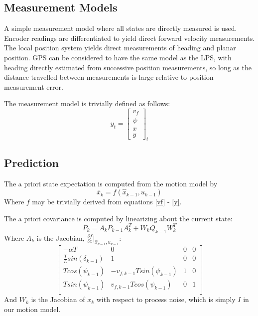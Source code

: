 \documentclass[11pt]{article} %
\begin{document}
\subsection{Measurement Models}

A simple measurement model where all states are directly measured is used.  Encoder readings are differentiated to yield direct forward velocity measurements.
The local position system yields direct measurements of heading and planar position.  
GPS can be considered to have the same model as the LPS, with heading directly estimated from successive position measurements, so long as the distance travelled between measurements is large relative to position measurement error.

The measurement model is trivially defined as follows:
\begin{equation}
y_t = \left[ \begin{array}{c} v_f \\ \psi \\ x \\ y \end{array} \right]_t
\end{equation}

\subsection{Prediction}

The a priori state expectation is computed from the motion model by
\begin{equation}
\bar{x}_k = f(\hat{x}_{k-1}, u_{k-1})
\end{equation}
Where $f$ may be trivially derived from equations \ref{vf} - \ref{y}. 

The a priori covariance is computed by linearizing about the current state:
\begin{equation}
\bar{P}_k = A_kP_{k-1}A_k^T + W_kQ_{k-1}W_k^T
\end{equation}
Where $A_k$ is the Jacobian, $\frac{\delta f}{\delta x} | _{\hat{x}_{k-1}, u_{k-1}}$:
\renewcommand{\arraystretch}{1.4}
\begin{equation}
\left[ \begin{array}{cccc}
-\alpha T & 0 & 0 & 0 \\
\frac{T}{L} sin( \delta _{k-1} ) & 1 & 0 & 0 \\
T cos(\psi _{k-1}) & - v_{f,k-1} T sin( \psi _{k-1}) & 1 & 0 \\
T sin(\psi _{k-1}) & v_{f,k-1} T cos ( \psi _{k-1}) & 0 & 1 \\
\end{array} \right]
\end{equation}
\renewcommand{\arraystretch}{1}
And $W_k$ is the Jacobian of $x_k$ with respect to process noise, which is simply $I$ in our motion model.
\end{document}
